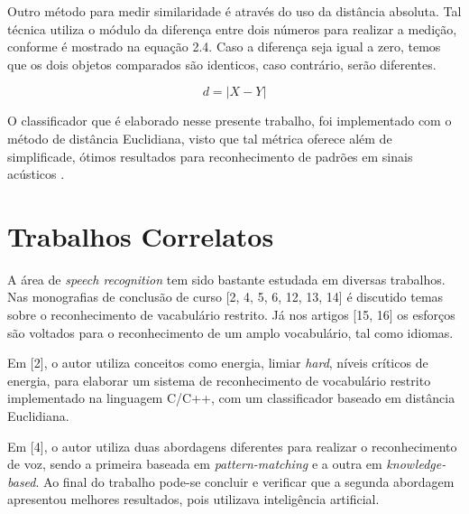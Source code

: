 \documentclass[a4paper,12pt,twoside,openright]{report}
\begin{document}
\vspace*{+10pt}

\par Outro m\'{e}todo para medir similaridade \'{e} atrav\'{e}s do uso da dist\^{a}ncia absoluta. Tal t\'{e}cnica utiliza o m\'{o}dulo da diferen{\c c}a entre dois n\'{u}meros para realizar a medi{\c c}\~{a}o, conforme \'{e} mostrado na equa{\c c}\~{a}o 2.4. Caso a diferen{\c c}a seja igual a zero, temos que os dois objetos comparados s\~{a}o identicos, caso contr\'{a}rio, ser\~{a}o diferentes.

\begin{equation}
	d = |X - Y|
\end{equation}

\par O classificador que \'{e} elaborado nesse presente trabalho, foi implementado com o m\'{e}todo de dist\^{a}ncia Euclidiana, visto que tal m\'{e}trica oferece al\'{e}m de simplificade, \'{o}timos resultados para reconhecimento de padr\~{o}es em sinais ac\'{u}sticos \cite{Marcel_Kfouri}.

\section{Trabalhos Correlatos}
\label{trabalhos_correlatos}
\par A \'{a}rea de \textit{speech recognition} tem sido bastante estudada em diversas trabalhos. Nas monografias de conclus\~{a}o de curso [2, 4, 5, 6, 12, 13, 14] \'{e} discutido temas sobre o reconhecimento de vacabul\'{a}rio restrito. J\'{a} nos artigos [15, 16] os esfor{\c c}os s\~{a}o voltados para o reconhecimento de um amplo vocabul\'{a}rio, tal como idiomas.

\par Em [2], o autor utiliza conceitos como energia, limiar \textit{hard}, n\'{i}veis cr\'{i}ticos de energia, para elaborar um sistema  de reconhecimento de vocabul\'{a}rio restrito implementado na linguagem C/C++, com um classificador baseado em dist\^{a}ncia Euclidiana.

\par Em [4], o autor utiliza duas abordagens diferentes para realizar o reconhecimento de voz, sendo a primeira baseada em \textit{pattern-matching} e a outra em \textit{knowledge-based}. Ao final do trabalho pode-se concluir e verificar que a segunda abordagem apresentou melhores resultados, pois utilizava intelig\^{e}ncia artificial.
\end{document}
